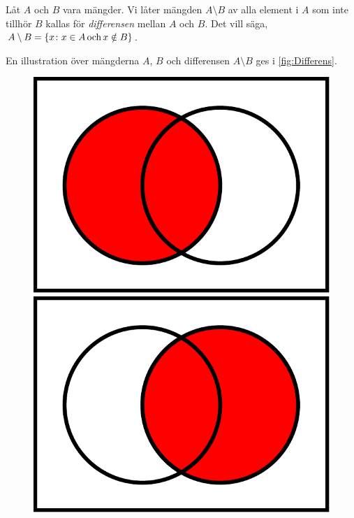 \begin{definition}\label{def:Mangddifferens}
  Låt \(A\) och \(B\) vara mängder.
  Vi låter mängden \(A\setminus B\) av alla element i \(A\) som inte tillhör
  \(B\) kallas för \emph{differensen} mellan \(A\) och \(B\).
  Det vill säga, \(A\setminus B = \{x\colon x\in A\operatorname{och} x\notin B\}\).
\end{definition}
En illustration över mängderna \(A\), \(B\) och differensen \(A\setminus B\) 
ges i \cref{fig:Differens}.
\begin{figure}
  \begin{minipage}{0.3\textwidth}
    \includegraphics[width=\textwidth]{figs/A.pdf}
  \end{minipage}
  \hfill
  \begin{minipage}{0.3\textwidth}
    \includegraphics[width=\textwidth]{figs/B.pdf}

\end{minipage}
\end{figure}
